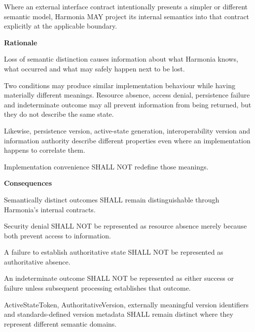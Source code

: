 Where an external interface contract intentionally presents a simpler or different semantic model, Harmonia MAY project its internal semantics into that contract explicitly at the applicable boundary.



\par\medskip\textbf{Rationale}\par


Loss of semantic distinction causes information about what Harmonia knows, what occurred and what may safely happen next to be lost.



Two conditions may produce similar implementation behaviour while having materially different meanings. Resource absence, access denial, persistence failure and indeterminate outcome may all prevent information from being returned, but they do not describe the same state.



Likewise, persistence version, active-state generation, interoperability version and information authority describe different properties even where an implementation happens to correlate them.



Implementation convenience SHALL NOT redefine those meanings.



\par\medskip\textbf{Consequences}\par


Semantically distinct outcomes SHALL remain distinguishable through Harmonia's internal contracts.



Security denial SHALL NOT be represented as resource absence merely because both prevent access to information.



A failure to establish authoritative state SHALL NOT be represented as authoritative absence.



An indeterminate outcome SHALL NOT be represented as either success or failure unless subsequent processing establishes that outcome.



ActiveStateToken, AuthoritativeVersion, externally meaningful version identifiers and standards-defined version metadata SHALL remain distinct where they represent different semantic domains.



